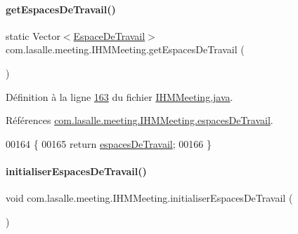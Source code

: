\paragraph{\texorpdfstring{get\+Espaces\+De\+Travail()}{getEspacesDeTravail()}}
{\footnotesize\ttfamily static Vector$<$\hyperlink{classcom_1_1lasalle_1_1meeting_1_1_espace_de_travail}{Espace\+De\+Travail}$>$ com.\+lasalle.\+meeting.\+I\+H\+M\+Meeting.\+get\+Espaces\+De\+Travail (\begin{DoxyParamCaption}{ }\end{DoxyParamCaption})\hspace{0.3cm}{\ttfamily [static]}}



Définition à la ligne \hyperlink{_i_h_m_meeting_8java_source_l00163}{163} du fichier \hyperlink{_i_h_m_meeting_8java_source}{I\+H\+M\+Meeting.\+java}.



Références \hyperlink{_i_h_m_meeting_8java_source_l00051}{com.\+lasalle.\+meeting.\+I\+H\+M\+Meeting.\+espaces\+De\+Travail}.


\begin{DoxyCode}
00164     \{
00165         \textcolor{keywordflow}{return} \hyperlink{classcom_1_1lasalle_1_1meeting_1_1_i_h_m_meeting_acba41978aec60c27f07db774f9b68b68}{espacesDeTravail};
00166     \}
\end{DoxyCode}
\mbox{\label{classcom_1_1lasalle_1_1meeting_1_1_i_h_m_meeting_ad4660f416b16b6df0f96d58f4c36b6f6}} 
\paragraph{\texorpdfstring{initialiser\+Espaces\+De\+Travail()}{initialiserEspacesDeTravail()}}
{\footnotesize\ttfamily void com.\+lasalle.\+meeting.\+I\+H\+M\+Meeting.\+initialiser\+Espaces\+De\+Travail (\begin{DoxyParamCaption}{ }\end{DoxyParamCaption})\hspace{0.3cm}{\ttfamily [private]}}



